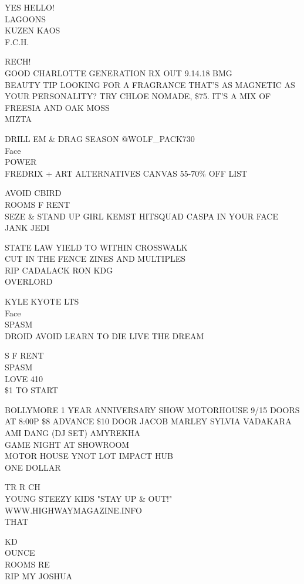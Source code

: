 \documentclass[10pt,letterpaper]{article}
\begin{document}
YES HELLO!\\
LAGOONS\\
KUZEN KAOS\\
F.C.H.

RECH!\\
GOOD CHARLOTTE GENERATION RX OUT 9.14.18 BMG\\
BEAUTY TIP LOOKING FOR A FRAGRANCE THAT'S AS MAGNETIC AS YOUR PERSONALITY?  TRY CHLOE NOMADE, \$75.  IT'S A MIX OF FREESIA AND OAK MOSS\\
MIZTA

DRILL EM \& DRAG SEASON @WOLF\_PACK730\\
Face\\
POWER\\
FREDRIX + ART ALTERNATIVES CANVAS 55{-}70\% OFF LIST

AVOID CBIRD\\
ROOMS F RENT\\
SEZE \& STAND UP GIRL KEMST HITSQUAD CASPA IN YOUR FACE\\
JANK JEDI

STATE LAW YIELD TO WITHIN CROSSWALK\\
CUT IN THE FENCE ZINES AND MULTIPLES\\
RIP CADALACK RON KDG\\
OVERLORD

KYLE KYOTE LTS\\
Face\\
SPASM\\
DROID AVOID LEARN TO DIE LIVE THE DREAM

S F RENT\\
SPASM\\
LOVE 410\\
\$1 TO START

BOLLYMORE 1 YEAR ANNIVERSARY SHOW MOTORHOUSE 9/15 DOORS AT 8:00P \$8 ADVANCE \$10 DOOR JACOB MARLEY SYLVIA VADAKARA AMI DANG (DJ SET) AMYREKHA\\
GAME NIGHT AT SHOWROOM\\
MOTOR HOUSE YNOT LOT IMPACT HUB\\
ONE DOLLAR

TR R CH\\
YOUNG STEEZY KIDS "STAY UP \& OUT!"\\
WWW.HIGHWAYMAGAZINE.INFO\\
THAT

KD\\
OUNCE\\
ROOMS RE\\
RIP MY JOSHUA
\end{document}
